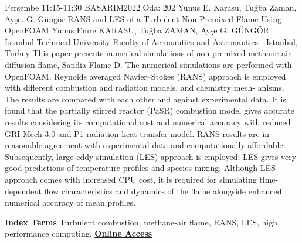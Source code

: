 
    \begin{abstract_basarim}
    {Perşembe 11:15-11:30}
    {BASARIM2022}
    {Oda: 202}
    {Yunus E. Karasu, Tuğba Zaman, Ayşe. G. Güngör}
    {RANS and LES of a Turbulent Non-Premixed Flame Using OpenFOAM}
    {%
    Yunus Emre KARASU, Tuğba ZAMAN, Ayşe G. GÜNGÖR}
    {%
    }
    {%
    İstanbul Technical University Faculty of Aeronautics and Astronautics - Istanbul, Turkey}
    This paper presents numerical simulations of non-premixed methane-air diffusion flame, Sandia Flame D. The numerical simulations are performed with OpenFOAM. Reynolds averaged Navier–Stokes (RANS) approach is employed with different combustion and radiation models, and chemistry mech- anisms. The results are compared with each other and against experimental data. It is found that the partially stirred reactor (PaSR) combustion model gives accurate results considering its computational cost and numerical accuracy with reduced GRI-Mech 3.0 and P1 radiation heat transfer model. RANS results are in reasonable agreement with experimental data and computationally affordable. Subsequently, large eddy simulation (LES) approach is employed. LES gives very good predictions of temperature profiles and species mixing. Although LES approach comes with increased CPU cost, it is required for simulating time-dependent flow characteristics and dynamics of the flame alongside enhanced numerical accuracy of mean profiles. 
    
            \textbf{Index Terms} \newline{}Turbulent combustion, methane-air flame, RANS, LES, high performance computing.
     \newline\newline\noindent \href{https://drive.google.com/file/d/1KEsXY5po380TnyMqCUVs7iwCu_9y7Beh/view?usp=sharing}{\bfseries Online Access}
    \end{abstract_basarim}
    